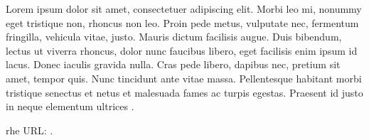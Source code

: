 \documentclass[a4paper,10pt,openany,oneside,english]{sphinxmanual}
\begin{document}
\sphinxAtStartPar
Lorem ipsum dolor sit amet, consectetuer adipiscing elit. Morbi leo mi, nonummy eget tristique non, rhoncus non leo.
Proin pede metus, vulputate nec, fermentum fringilla, vehicula vitae, justo. Mauris dictum facilisis augue. Duis bibendum,
lectus ut viverra rhoncus, dolor nunc faucibus libero, eget facilisis enim ipsum id lacus. Donec iaculis gravida nulla.
Cras pede libero, dapibus nec, pretium sit amet, tempor quis. Nunc tincidunt ante vitae massa. Pellentesque habitant
morbi tristique senectus et netus et malesuada fames ac turpis egestas.
Praesent id justo in neque elementum ultrices \sphinxfootnotemark[1].

\sphinxAtStartPar


\begin{sphinxthebibliography}{rhe}
\sphinxAtStartPar
URL: .
\end{sphinxthebibliography}



\renewcommand{\indexname}{Index}
\printindex
\end{document}
